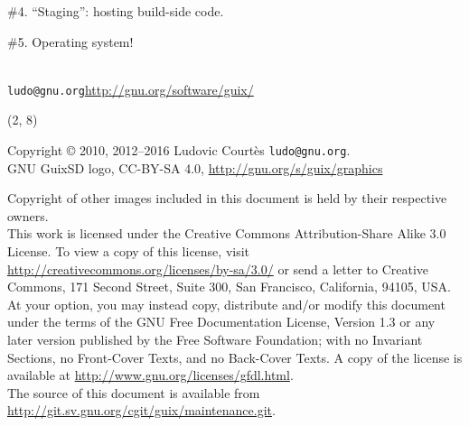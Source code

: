 \documentclass{beamer}
\begin{document}
\begin{frame}[plain]
  \Huge{\#4. ``Staging'': hosting build-side code.}
\end{frame}

\begin{frame}[plain]
  \Huge{\#5. Operating system!}
\end{frame}

\begin{frame}[plain]

\vfill{
  \vspace{2.5cm}
  \\[1.0cm]
  \texttt{ludo@gnu.org}\hfill{\alert{\url{http://gnu.org/software/guix/}}}
}

\end{frame}

\begin{frame}{}

  \begin{textblock}{12}(2, 8)
    \tiny{
      Copyright \copyright{} 2010, 2012--2016 Ludovic Courtès \texttt{ludo@gnu.org}.\\[3.0mm]
      GNU GuixSD logo, CC-BY-SA 4.0, \url{http://gnu.org/s/guix/graphics}

      Copyright of other images included in this document is held by
      their respective owners.
      \\[3.0mm]
      This work is licensed under the \alert{Creative Commons
        Attribution-Share Alike 3.0} License.  To view a copy of this
      license, visit
      \url{http://creativecommons.org/licenses/by-sa/3.0/} or send a
      letter to Creative Commons, 171 Second Street, Suite 300, San
      Francisco, California, 94105, USA.
      \\[2.0mm]
      At your option, you may instead copy, distribute and/or modify
      this document under the terms of the \alert{GNU Free Documentation
        License, Version 1.3 or any later version} published by the Free
      Software Foundation; with no Invariant Sections, no Front-Cover
      Texts, and no Back-Cover Texts.  A copy of the license is
      available at \url{http://www.gnu.org/licenses/gfdl.html}.
      \\[2.0mm]
      The source of this document is available from
      \url{http://git.sv.gnu.org/cgit/guix/maintenance.git}.
    }
  \end{textblock}
\end{frame}
\end{document}
